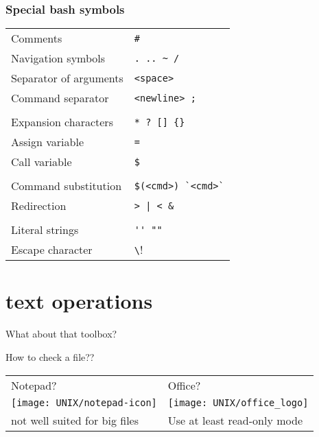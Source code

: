 \documentclass[xcolor=dvipsnames]{beamer}
\begin{document}
\begin{frame}[fragile]
	\frametitle{Special bash symbols}
	\large
	\begin{tabular}{L{0.45\textwidth} L{0.5\textwidth}}
	Comments & \verb!#! \\
	Navigation symbols & \verb!. .. ~ /! \\
	Separator of arguments & \verb!<space>! \\
	Command separator & \verb!<newline> ;! \\
	& \\
	Expansion characters & \verb!* ? [] {}! \\
	Assign variable & \verb!=! \\
	Call variable & \verb!$! \\
	& \\
	Command substitution & \verb!$(<cmd>) `<cmd>`! \\
	Redirection & \verb!> | < &! \\
	& \\
	Literal strings & \verb!'' ""! \\
	Escape character & \verb!\! \\
	\end{tabular}
\end{frame}

\section{text operations}

\begin{frame}
	\Huge
	\begin{center}
		What about that toolbox?
	\end{center}
\end{frame}

\begin{frame}
	\begin{center}
	\huge
	How to check a file?? \\
	\vspace{1cm}

	\Large
	\begin{tabular}{C{0.4\textwidth}C{0.4\textwidth}}
	Notepad? & Office? \\
	\texttt{[image: UNIX/notepad-icon]} & \texttt{[image: UNIX/office\_logo]} \\
	\small not well suited for big files & \small Use at least read-only mode\\
	\end{tabular}
	\end{center}
\end{frame}
\end{document}
